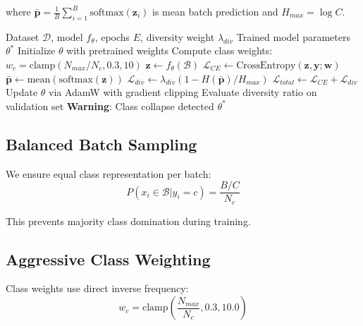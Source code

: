 \documentclass[journal]{IEEEtran}
\begin{document}
where $\bar{\mathbf{p}} = \frac{1}{B}\sum_{i=1}^{B} \text{softmax}(\mathbf{z}_i)$ is mean batch prediction and $H_{max} = \log C$.

\begin{algorithm}[!t]
\caption{Diversity-Aware Training}
\label{alg:training}
\begin{algorithmic}[1]
\REQUIRE Dataset $\mathcal{D}$, model $f_\theta$, epochs $E$, diversity weight $\lambda_{div}$
\ENSURE Trained model parameters $\theta^*$
\STATE Initialize $\theta$ with pretrained weights
\STATE Compute class weights: $w_c = \text{clamp}(N_{max}/N_c, 0.3, 10)$
        \STATE $\mathbf{z} \leftarrow f_\theta(\mathcal{B})$ 
        \STATE $\mathcal{L}_{CE} \leftarrow \text{CrossEntropy}(\mathbf{z}, \mathbf{y}; \mathbf{w})$
        \STATE $\bar{\mathbf{p}} \leftarrow \text{mean}(\text{softmax}(\mathbf{z}))$
        \STATE $\mathcal{L}_{div} \leftarrow \lambda_{div}(1 - H(\bar{\mathbf{p}})/H_{max})$
        \STATE $\mathcal{L}_{total} \leftarrow \mathcal{L}_{CE} + \mathcal{L}_{div}$
        \STATE Update $\theta$ via AdamW with gradient clipping
    \ENDFOR
    \STATE Evaluate diversity ratio on validation set
        \STATE \textbf{Warning}: Class collapse detected
    \ENDIF
\ENDFOR
\RETURN $\theta^*$
\end{algorithmic}
\end{algorithm}

\subsection{Balanced Batch Sampling}

We ensure equal class representation per batch:
\begin{equation}
P(x_i \in \mathcal{B} | y_i = c) = \frac{B/C}{N_c}
\end{equation}

This prevents majority class domination during training.

\subsection{Aggressive Class Weighting}

Class weights use direct inverse frequency:
\begin{equation}
w_c = \text{clamp}\left(\frac{N_{max}}{N_c}, 0.3, 10.0\right)
\end{equation}
\end{document}
